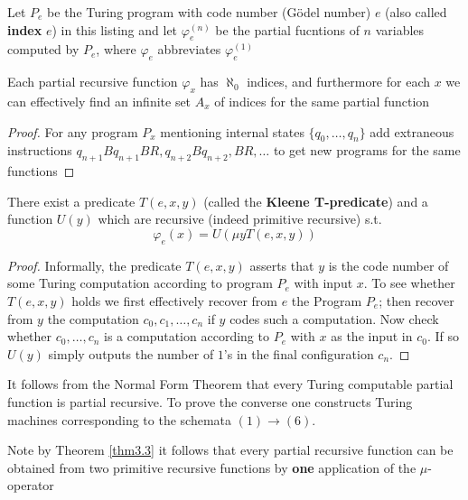 \documentclass[11pt]{article}
\begin{document}
\begin{definition}[]
Let \(P_e\) be the Turing program with code number (Gödel number) \(e\) 
(also called \textbf{index} \(e\)) in this
listing and let \(\varphi_e^{(n)}\) be the partial fucntions of \(n\) variables
computed by \(P_e\), where \(\varphi_e\) abbreviates \(\varphi_e^{(1)}\)
\end{definition}

\begin{lemma}
\label{lemma1.3.2}
Each partial recursive function \(\varphi_x\) has \(\aleph_0\) indices, and
furthermore for each \(x\) we can effectively find an infinite set \(A_x\) of
indices for the same partial function
\end{lemma}


\begin{proof}
For any program \(P_x\) mentioning internal states \(\{q_0,\dots,q_n\}\) add
extraneous instructions \(q_{n+1}Bq_{n+1}BR,q_{n+2}Bq_{n+2},BR,\dots\) to get
new programs for the same functions
\end{proof}
\begin{theorem}
\label{thm1.3.3}
There exist a predicate \(T(e,x,y)\) (called the \textbf{Kleene T-predicate}) and a
function \(U(y)\) which are recursive (indeed primitive recursive) s.t.
\begin{equation*}
\varphi_e(x)=U(\mu y T(e,x,y))
\end{equation*}
\end{theorem}

\begin{proof}
Informally, the predicate \(T(e,x,y)\) asserts that \(y\) is the code number
of some Turing computation according to program \(P_e\) with input \(x\). To
see whether \(T(e,x,y)\) holds we first effectively recover from \(e\) the
Program \(P_e\); then recover from \(y\) the computation
\(c_0,c_1,\dots,c_n\) if \(y\) codes such a computation. Now check whether
\(c_0,\dots,c_n\) is a computation according to \(P_e\) with \(x\) as the
input in \(c_0\). If so \(U(y)\) simply outputs the number of \(1\)'s in the
final configuration \(c_n\).
\end{proof}

It follows from the Normal Form Theorem that every Turing computable partial
function is partial recursive. To prove the converse one constructs Turing
machines corresponding to the schemata \((1)\to(6)\).

Note by Theorem \ref{thm3.3} it follows that every partial recursive function
can be obtained from two primitive recursive functions by \textbf{one} application
of the \(\mu\)-operator
\end{document}
